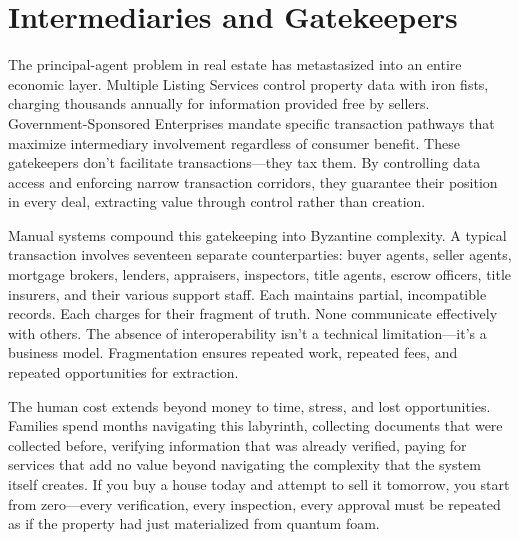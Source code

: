 \section{Intermediaries and Gatekeepers}

The principal-agent problem in real estate has metastasized into an entire economic layer. Multiple Listing Services control property data with iron fists, charging thousands annually for information provided free by sellers. Government-Sponsored Enterprises mandate specific transaction pathways that maximize intermediary involvement regardless of consumer benefit. These gatekeepers don't facilitate transactions—they tax them. By controlling data access and enforcing narrow transaction corridors, they guarantee their position in every deal, extracting value through control rather than creation.

Manual systems compound this gatekeeping into Byzantine complexity. A typical transaction involves seventeen separate counterparties: buyer agents, seller agents, mortgage brokers, lenders, appraisers, inspectors, title agents, escrow officers, title insurers, and their various support staff. Each maintains partial, incompatible records. Each charges for their fragment of truth. None communicate effectively with others. The absence of interoperability isn't a technical limitation—it's a business model. Fragmentation ensures repeated work, repeated fees, and repeated opportunities for extraction.

The human cost extends beyond money to time, stress, and lost opportunities. Families spend months navigating this labyrinth, collecting documents that were collected before, verifying information that was already verified, paying for services that add no value beyond navigating the complexity that the system itself creates. If you buy a house today and attempt to sell it tomorrow, you start from zero—every verification, every inspection, every approval must be repeated as if the property had just materialized from quantum foam.

